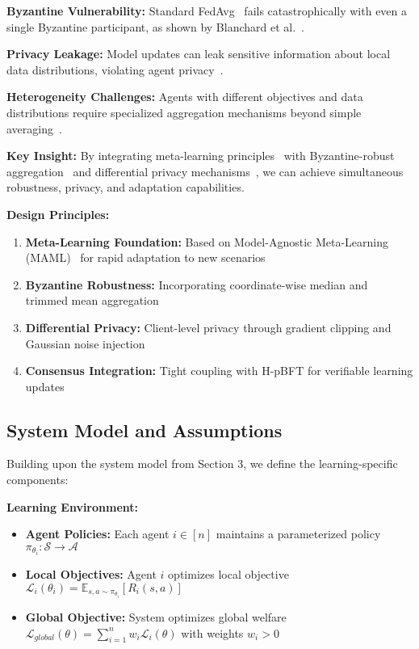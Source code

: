 \documentclass[conference]{IEEEtran}
\begin{document}
\textbf{Byzantine Vulnerability:} Standard FedAvg~\cite{mcmahan2017federated} fails catastrophically with even a single Byzantine participant, as shown by Blanchard et al.~\cite{blanchard2017machine}.

\textbf{Privacy Leakage:} Model updates can leak sensitive information about local data distributions, violating agent privacy~\cite{abadi2016deep}.

\textbf{Heterogeneity Challenges:} Agents with different objectives and data distributions require specialized aggregation mechanisms beyond simple averaging~\cite{li2020federated}.

\textbf{Key Insight:} By integrating meta-learning principles~\cite{finn2017model} with Byzantine-robust aggregation~\cite{chen2017distributed} and differential privacy mechanisms~\cite{abadi2016deep}, we can achieve simultaneous robustness, privacy, and adaptation capabilities.

\textbf{Design Principles:}
\begin{enumerate}
    \item \textbf{Meta-Learning Foundation:} Based on Model-Agnostic Meta-Learning (MAML)~\cite{finn2017model} for rapid adaptation to new scenarios
    \item \textbf{Byzantine Robustness:} Incorporating coordinate-wise median and trimmed mean aggregation~\cite{chen2017distributed}
    \item \textbf{Differential Privacy:} Client-level privacy through gradient clipping and Gaussian noise injection~\cite{abadi2016deep}
    \item \textbf{Consensus Integration:} Tight coupling with H-pBFT for verifiable learning updates
\end{enumerate}

\subsection{System Model and Assumptions}

Building upon the system model from Section 3, we define the learning-specific components:

\textbf{Learning Environment:}
\begin{itemize}
    \item \textbf{Agent Policies:} Each agent $i \in [n]$ maintains a parameterized policy $\pi_{\theta_i}: \mathcal{S} \rightarrow \mathcal{A}$
    \item \textbf{Local Objectives:} Agent $i$ optimizes local objective $\mathcal{L}_i(\theta_i) = \mathbb{E}_{s,a \sim \pi_{\theta_i}}[R_i(s,a)]$
    \item \textbf{Global Objective:} System optimizes global welfare $\mathcal{L}_{global}(\theta) = \sum_{i=1}^n w_i \mathcal{L}_i(\theta)$ with weights $w_i > 0$
\end{itemize}
\end{document}
